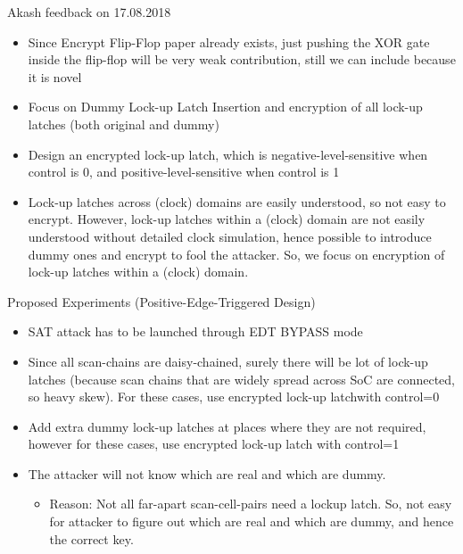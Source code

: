 \begin{frame}{Akash feedback on 17.08.2018}
\begin{itemize}
\item Since \alert{Encrypt Flip-Flop} paper already exists, just pushing the XOR gate inside the flip-flop will be very weak contribution, \alert{still we can include because it is novel}
\item Focus on Dummy Lock-up Latch Insertion and encryption of all lock-up latches (both original and dummy)
\item Design an encrypted lock-up latch, which is negative-level-sensitive when control is \alert{0}, and positive-level-sensitive when control is \alert{1}
\item Lock-up latches across (clock) domains are easily understood, so not easy to encrypt. However, lock-up latches within a (clock) domain are not easily understood without detailed clock simulation, hence possible to introduce dummy ones and encrypt to fool the attacker. So, we focus on encryption of lock-up latches within a (clock) domain. 
\end{itemize}
\end{frame}

\begin{frame}{Proposed Experiments (Positive-Edge-Triggered Design)}
	\begin{itemize}
		\item SAT attack has to be launched through EDT BYPASS mode
		\item Since all scan-chains are daisy-chained, surely there will be lot of lock-up latches (because scan chains that are widely spread across SoC are connected, so heavy skew). For these cases, use encrypted lock-up latchwith control=0
		\item Add extra dummy lock-up latches at places where they are not required, however for these cases, use encrypted lock-up latch with control=1
		\item The attacker will not know which are real and which are dummy. 
			\begin{itemize}
				\item \alert{Reason}: Not all far-apart scan-cell-pairs need a lockup latch. So, not easy for attacker to figure out which are real and which are dummy, and hence the correct key. 
			\end{itemize}
	\end{itemize}
\end{frame}

